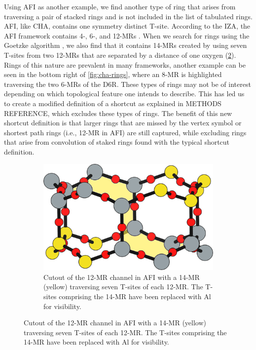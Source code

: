 \documentclass[11pt]{article}
\begin{document}
Using AFI as another example, we find another type of ring that arises from traversing a pair of stacked rings and is not included in the list of tabulated rings. AFI, like CHA, contains one symmetry distinct T-site. According to the IZA, the AFI framework contains 4-, 6-, and 12-MRs \cite{baerlocher-database-nodate}. When we search for rings using the Goetzke algorithm \cite{goetzke-properties-1991}, we also find that it contains 14-MRs created by using seven T-sites from two 12-MRs that are separated by a distance of one oxygen (\cref{fig:afi-14}). Rings of this nature are prevalent in many frameworks, another example can be seen in the bottom right of \cref{fig:cha-rings}, where an 8-MR is highlighted traversing the two 6-MRs of the D6R. These types of rings may not be of interest depending on which topological feature one intends to describe. This has led us to create a modified definition of a shortcut as explained in METHODS REFERENCE, which excludes these types of rings. The benefit of this new shortcut definition is that larger rings that are missed by the vertex symbol or shortest path rings (i.e., 12-MR in AFI) are still captured, while excluding rings that arise from convolution of staked rings found with the typical shortcut definition.

\begin{figure}
\begin{figure}[H]
\centering
\includegraphics[width=\textwidth]{figures/chapter-3/afi-14.pdf}
\caption{Cutout of the 12-MR channel in AFI with a 14-MR (yellow) traversing seven T-sites of each 12-MR. The T-sites comprising the 14-MR have been replaced with Al for visibility. \label{fig:afi-14}}
\end{figure}
\end{figure}
\end{document}
